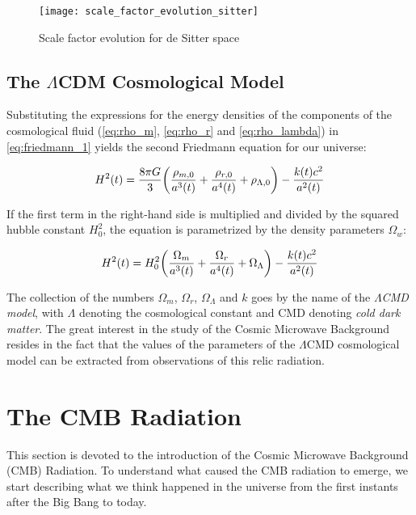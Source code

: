 \begin{figure}
        \centering
        \texttt{[image: scale\_factor\_evolution\_sitter]}
        \caption{Scale factor evolution for de Sitter space}
        \label{fig:scale_factor_evolution_sitter}
\end{figure}

\subsection{The \texorpdfstring{$\Lambda$}{LAMBDA-}CDM Cosmological Model}

Substituting the expressions for the energy densities of the components of
the cosmological fluid (\autoref{eq:rho_m}, \autoref{eq:rho_r} and
\autoref{eq:rho_lambda}) in \autoref{eq:friedmann_1} yields the second
Friedmann equation for our universe:

\begin{equation}
        H^2\qty(t) = \frac{8\pi G}{3} \qty(\frac{\rho_{m,0}}{a^3\qty(t)} +
        \frac{\rho_{r,0}}{a^4\qty(t)} + \rho_{\Lambda,0}) -
        \frac{k\qty(t) c^2}{a^2\qty(t)}
\end{equation}

If the first term in the right-hand side is multiplied and
divided by the squared hubble constant $H^2_0$, the equation is parametrized
by the density parameters $\Omega_w$:

\begin{equation}
        H^2\qty(t) = H^2_0 \qty(\frac{\Omega_m}{a^3\qty(t)} +
        \frac{\Omega_r}{a^4\qty(t)} + \Omega_\Lambda) -
        \frac{k\qty(t) c^2}{a^2\qty(t)}
\end{equation}

The collection of the numbers $\Omega_m$, $\Omega_r$, $\Omega_\Lambda$ and
$k$ goes by the name of the \emph{$\Lambda$CMD model}, with $\Lambda$
denoting the cosmological constant and CMD denoting \emph{cold dark matter}.
The great interest in the study of the Cosmic Microwave Background resides
in the fact that the values of the parameters of the $\Lambda$CMD
cosmological model can be extracted from observations of this relic
radiation.

\section{The CMB Radiation}

This section is devoted to the introduction of the Cosmic Microwave
Background (CMB) Radiation. To understand what caused the CMB radiation to
emerge, we start describing what we think happened in the universe from the
first instants after the Big Bang to today.

